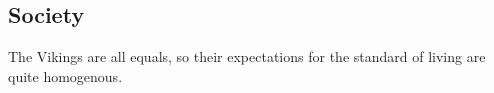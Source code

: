 \subsection{Society}\label{ch:Tribes:Vikings:Society}
The \gls{Vikings} are all equals, so their expectations for the standard of living are quite homogenous.


